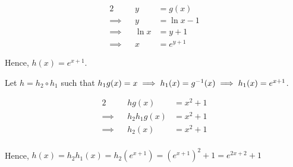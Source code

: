 \documentclass{echw}
\begin{document}
                \begin{alignat*}{2}
                    &&y &= g(x)\\
                    \implies&&y &= \ln x - 1\\
                    \implies&&\ln x &= y+1\\
                    \implies&&x &= e^{y+1}
                \end{alignat*}

                Hence, $h(x) = e^{x+1}$.


            \subpart
                Let $h = h_2 \circ h_1$ such that $h_1g(x) = x \implies h_1(x) = g^{-1}(x) \implies h_1(x) = e^{x+1}$.

                \begin{alignat*}{2}
                    &&hg(x) &= x^2+1\\
                    \implies&&h_2h_1g(x) &= x^2+1\\
                    \implies&&h_2(x) &= x^2+1\\
                \end{alignat*}

                Hence, $h(x) = h_2h_1(x) = h_2(e^{x+1}) = \left(e^{x+1}\right)^2 + 1 = e^{2x+2} + 1$

\end{document}
